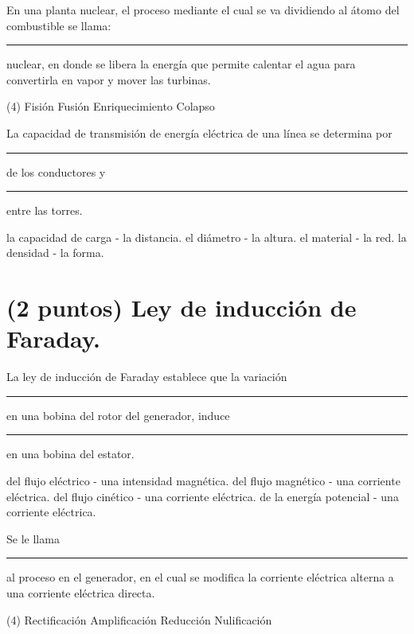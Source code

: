 \documentclass[12pt, letter]{exam}
\begin{document}
\begin{questions}
    \question En una planta nuclear, el proceso mediante el cual se va dividiendo al átomo del combustible se llama: \rule{2cm}{0.1mm} nuclear, en donde se libera la energía que permite calentar el agua para convertirla en vapor y mover las turbinas.
    \begin{tasks}(4)
        \task Fisión
        \task Fusión
        \task Enriquecimiento
        \task Colapso
    \end{tasks}
    \question La capacidad de transmisión de energía eléctrica de una línea se determina por \rule{2cm}{0.1mm} de los conductores y \rule{2cm}{0.1mm} entre las torres.
    \begin{multicols}{2}
    \begin{tasks}
        \task la capacidad de carga - la distancia.
        \task el diámetro - la altura.
        \task el material - la red.
        \task la densidad - la forma.
    \end{tasks}
    \end{multicols}

    \section{(2 puntos) Ley de inducción de Faraday.}

    \question La ley de inducción de Faraday establece que la variación \rule{2cm}{0.1mm} en una bobina del rotor del generador, induce \rule{2cm}{0.1mm} en una bobina del estator.
    \begin{tasks}
        \task del flujo eléctrico - una intensidad magnética.
        \task del flujo magnético - una corriente eléctrica.
        \task del flujo cinético - una corriente eléctrica.
        \task de la energía potencial - una corriente eléctrica.
    \end{tasks}
    \question Se le llama \rule{2cm}{0.1mm} al proceso en el generador, en el cual se modifica la corriente eléctrica alterna a una corriente eléctrica directa.
    \begin{tasks}(4)
        \task Rectificación
        \task Amplificación
        \task Reducción
        \task Nulificación
    \end{tasks}



\end{questions}
\end{document}
